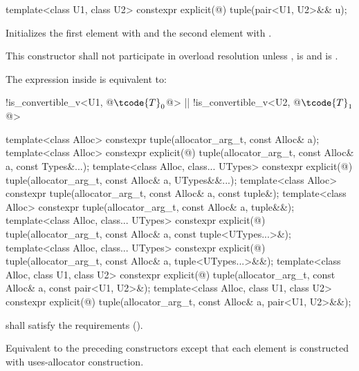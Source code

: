 %
%
\begin{itemdecl}
template<class U1, class U2> constexpr explicit(@\seebelow@) tuple(pair<U1, U2>&& u);
\end{itemdecl}

\begin{itemdescr}
\pnum
\effects Initializes the first element with
 and the
second element with .

\pnum
\remarks This constructor shall not participate in overload resolution unless
,
 is  and
 is .

\pnum
The expression inside  is equivalent to:
\begin{codeblock}
!is_convertible_v<U1, @$\tcode{T}_0$@> || !is_convertible_v<U2, @$\tcode{T}_1$@>
\end{codeblock}
\end{itemdescr}

%
\begin{itemdecl}
template<class Alloc>
  constexpr tuple(allocator_arg_t, const Alloc& a);
template<class Alloc>
  constexpr explicit(@\seebelow@)
    tuple(allocator_arg_t, const Alloc& a, const Types&...);
template<class Alloc, class... UTypes>
  constexpr explicit(@\seebelow@)
    tuple(allocator_arg_t, const Alloc& a, UTypes&&...);
template<class Alloc>
  constexpr tuple(allocator_arg_t, const Alloc& a, const tuple&);
template<class Alloc>
  constexpr tuple(allocator_arg_t, const Alloc& a, tuple&&);
template<class Alloc, class... UTypes>
  constexpr explicit(@\seebelow@)
    tuple(allocator_arg_t, const Alloc& a, const tuple<UTypes...>&);
template<class Alloc, class... UTypes>
  constexpr explicit(@\seebelow@)
    tuple(allocator_arg_t, const Alloc& a, tuple<UTypes...>&&);
template<class Alloc, class U1, class U2>
  constexpr explicit(@\seebelow@)
    tuple(allocator_arg_t, const Alloc& a, const pair<U1, U2>&);
template<class Alloc, class U1, class U2>
  constexpr explicit(@\seebelow@)
    tuple(allocator_arg_t, const Alloc& a, pair<U1, U2>&&);
\end{itemdecl}

\begin{itemdescr}
\pnum
\requires {} shall satisfy the
 requirements ().

\pnum
\effects Equivalent to the preceding constructors except that each element is constructed with
uses-allocator construction.
\end{itemdescr}

